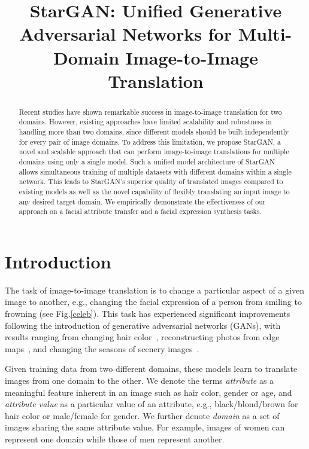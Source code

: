 \title{StarGAN: Unified Generative Adversarial Networks for Multi-Domain Image-to-Image Translation}

\begin{abstract}
Recent studies have shown remarkable success in image-to-image translation for two domains. However, existing approaches have limited scalability and robustness in handling more than two domains, since different models should be built independently for every pair of image domains. To address this limitation, we propose StarGAN, a novel and scalable approach that can perform image-to-image translations for multiple domains using only a single model. Such a unified model architecture of StarGAN allows simultaneous training of multiple datasets with different domains within a single network. This leads to StarGAN's superior quality of translated images compared to existing models as well as the novel capability of flexibly translating an input image to any desired target domain. We empirically demonstrate the effectiveness of our approach on a facial attribute transfer and a facial expression synthesis tasks.
\end{abstract}

\section{Introduction}

The task of image-to-image translation is to change a particular aspect of a given image to another, e.g., changing the facial expression of a person from smiling to frowning (see Fig.\thinspace\ref{celeb}). This task has experienced significant improvements following the introduction of generative adversarial networks (GANs), with results ranging from changing hair color~\cite{kim2017learning}, reconstructing photos from edge maps~\cite{Isola_2017_CVPR}, and changing the seasons of scenery images~\cite{zhu2017unpaired}. 

Given training data from two different domains, these models learn to translate images from one domain to the other. We denote the terms \textit{attribute} as a meaningful feature inherent in an image such as hair color, gender or age, and \textit{attribute value} as a particular value of an attribute, e.g., black/blond/brown for hair color or male/female for gender. We further denote \textit{domain} as a set of images sharing the same attribute value. For example, images of women can represent one domain while those of men represent another. 

